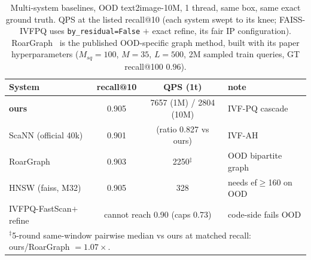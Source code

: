 \documentclass{article}
\begin{document}
\begin{table}[t]
\centering
\caption{Multi-system baselines, OOD text2image-10M, 1 thread, same box, same
exact ground truth. QPS at the listed recall@10 (each system swept to its knee;
FAISS-IVFPQ uses \texttt{by\_residual=False} $+$ exact refine, its fair IP
configuration). RoarGraph~\cite{roargraph} is the published OOD-specific
graph method, built with its paper hyperparameters ($M_{sq}{=}100$,
$M{=}35$, $L{=}500$, 2M sampled train queries, GT recall@100 $0.96$).}
\label{tab:t2i-baselines}
\vspace{3pt}
\begin{tabular}{lccl}
\toprule
System & recall@10 & QPS (1t) & note \\
\midrule
\textbf{ours}          & 0.905 & 7657 (1M) / 2804 (10M) & IVF-PQ cascade \\
ScaNN (official 40k)   & 0.901 & (ratio 0.827 vs ours) & IVF-AH \\
RoarGraph              & 0.903 & 2250$^{\ddagger}$ & OOD bipartite graph \\
HNSW (faiss, M32)      & 0.905 & 328  & needs ef$\ge$160 on OOD \\
IVFPQ-FastScan$+$refine & \multicolumn{2}{c}{cannot reach 0.90 (caps 0.73)} & code-side fails OOD \\
\multicolumn{4}{l}{\footnotesize $^{\ddagger}$5-round same-window pairwise median vs ours at matched recall: ours/RoarGraph $=1.07\times$.} \\
\bottomrule
\end{tabular}
\end{table}
\end{document}

